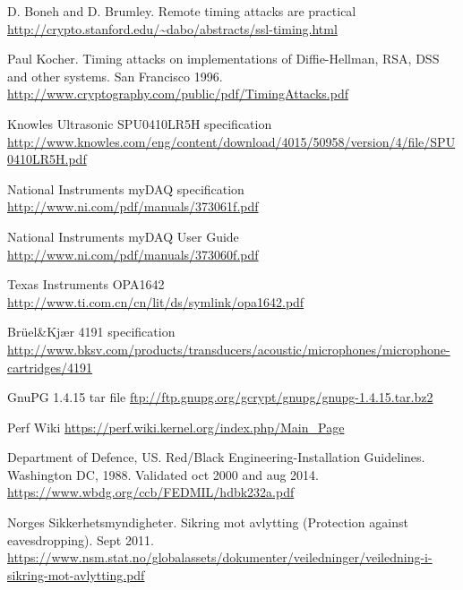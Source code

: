\begin{thebibliography}{18}

 D. Boneh and D. Brumley. Remote timing attacks are practical
\url{http://crypto.stanford.edu/~dabo/abstracts/ssl-timing.html}

 Paul Kocher. Timing attacks on implementations of Diffie-Hellman, RSA, DSS and other systems. San Francisco 1996.
\url{http://www.cryptography.com/public/pdf/TimingAttacks.pdf}


 Knowles Ultrasonic SPU0410LR5H specification
\url{http://www.knowles.com/eng/content/download/4015/50958/version/4/file/SPU0410LR5H.pdf}

 National Instruments myDAQ specification
\url{http://www.ni.com/pdf/manuals/373061f.pdf}

 National Instruments myDAQ User Guide
\url{http://www.ni.com/pdf/manuals/373060f.pdf}

 Texas Instruments OPA1642
\url{http://www.ti.com.cn/cn/lit/ds/symlink/opa1642.pdf}


 Brüel\&Kjær 4191 specification
\url{http://www.bksv.com/products/transducers/acoustic/microphones/microphone-cartridges/4191}


 GnuPG 1.4.15 tar file
\url{ftp://ftp.gnupg.org/gcrypt/gnupg/gnupg-1.4.15.tar.bz2}



 Perf Wiki
\url{https://perf.wiki.kernel.org/index.php/Main_Page}



 Department of Defence, US. Red/Black Engineering-Installation Guidelines. Washington DC, 1988. Validated oct 2000 and aug 2014.
\url{https://www.wbdg.org/ccb/FEDMIL/hdbk232a.pdf}

 Norges Sikkerhetsmyndigheter. Sikring mot avlytting (Protection against eavesdropping). Sept 2011. 
\url{https://www.nsm.stat.no/globalassets/dokumenter/veiledninger/veiledning-i-sikring-mot-avlytting.pdf}

\end{thebibliography}